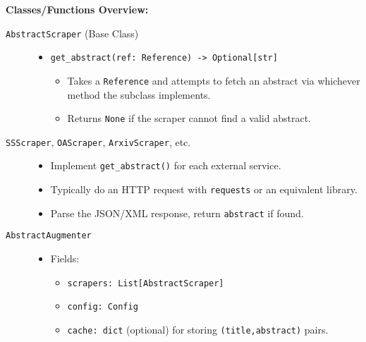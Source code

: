 \documentclass[12pt]{article}
\begin{document}
\textbf{Classes/Functions Overview:}

\begin{description}
  \item[\texttt{AbstractScraper} (Base Class)]
  \begin{itemize}
    \item \texttt{get\_abstract(ref: Reference) -> Optional[str]} 
    \begin{itemize}
      \item Takes a \texttt{Reference} and attempts to fetch an abstract via whichever method the subclass implements.
      \item Returns \texttt{None} if the scraper cannot find a valid abstract.
    \end{itemize}
  \end{itemize}

  \item[\texttt{SSScraper}, \texttt{OAScraper}, \texttt{ArxivScraper}, etc.] 
  \begin{itemize}
    \item Implement \texttt{get\_abstract()} for each external service. 
    \item Typically do an HTTP request with \texttt{requests} or an equivalent library.
    \item Parse the JSON/XML response, return \texttt{abstract} if found.
  \end{itemize}

  \item[\texttt{AbstractAugmenter}] 
  \begin{itemize}
    \item Fields: 
    \begin{itemize}
      \item \texttt{scrapers: List[AbstractScraper]}
      \item \texttt{config: Config}
      \item \texttt{cache: dict} (optional) for storing \texttt{(title,abstract)} pairs.
    \end{itemize}


\end{itemize}
\end{description}
\end{document}

